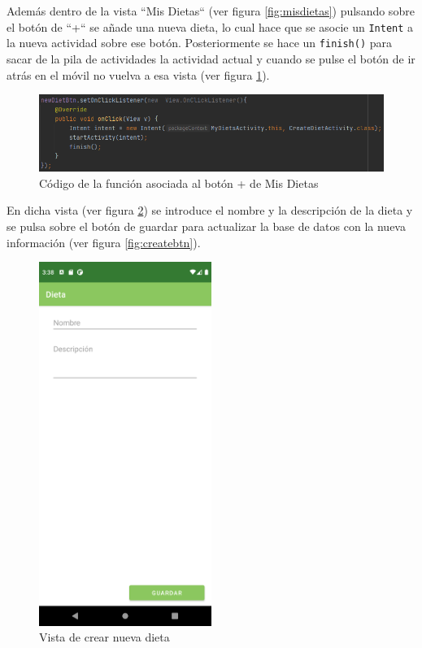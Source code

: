Además dentro de la vista ``Mis Dietas`` (ver figura \ref{fig:misdietas}) pulsando sobre el botón de ``+`` se añade una nueva dieta, lo cual hace que se asocie un \texttt{Intent} a la nueva actividad sobre ese botón. Posteriormente se hace un \texttt{finish()} \cite{finish_android_method} para sacar de la pila de actividades la actividad actual y cuando se pulse el botón de ir atrás en el móvil no vuelva a esa vista (ver figura \ref{fig:newdietbtn}).

\begin{figure}[H]
    \centering
    \includegraphics[width=\textwidth]{Images/Capitulo7/newdietbtn.png}
        \caption{Código de la función asociada al botón + de Mis Dietas}
    \label{fig:newdietbtn}
\end{figure}

En dicha vista (ver figura \ref{fig:creatediet}) se introduce el nombre y la descripción de la dieta y se pulsa sobre el botón de guardar para actualizar la base de datos con la nueva información (ver figura \ref{fig:createbtn}).

\begin{figure}[H]
    \centering
    \includegraphics[width=0.5\textwidth]{Images/Capitulo7/creatediet.png}
        \caption{Vista de crear nueva dieta}
    \label{fig:creatediet}
\end{figure}

